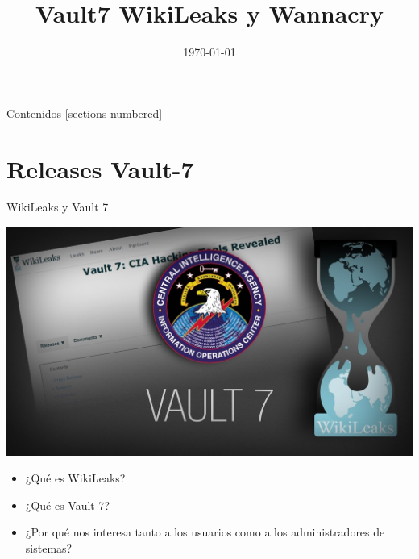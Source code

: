 \documentclass[10pt]{beamer}
\title{Vault7 WikiLeaks y Wannacry}
\date{\today}
\institute{Ingeniería de Servidores 2017 \\
	Universidad de Granada}
\begin{document}
\maketitle

\begin{frame}{Contenidos}
  [sections numbered]
  \tableofcontents[hideallsubsections]
\end{frame}

\section{Releases Vault-7}

\begin{frame}{WikiLeaks y Vault 7}
	\pause
	\begin{center}
		\includegraphics[scale=0.2]{./Imagenes/vault7.jpg}
	\end{center}
	\pause
	\begin{itemize}
		\item ¿Qué es WikiLeaks?
		\pause
		\item ¿Qué es Vault 7?
		\pause
		\item ¿Por qué nos interesa tanto a los usuarios como a los administradores de sistemas?
	\end{itemize}
\end{frame}
\end{document}
